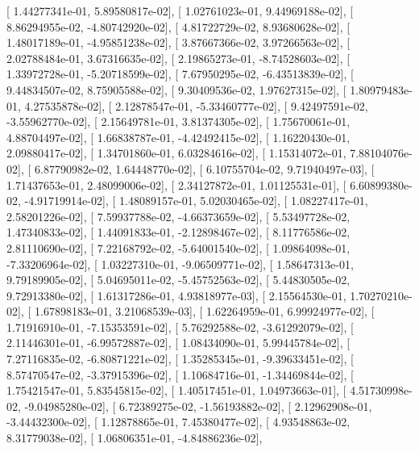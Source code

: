 \documentclass{article}
\begin{document}
       [  1.44277341e-01,   5.89580817e-02],
       [  1.02761023e-01,   9.44969188e-02],
       [  8.86294955e-02,  -4.80742920e-02],
       [  4.81722729e-02,   8.93680628e-02],
       [  1.48017189e-01,  -4.95851238e-02],
       [  3.87667366e-02,   3.97266563e-02],
       [  2.02788484e-01,   3.67316635e-02],
       [  2.19865273e-01,  -8.74528603e-02],
       [  1.33972728e-01,  -5.20718599e-02],
       [  7.67950295e-02,  -6.43513839e-02],
       [  9.44834507e-02,   8.75905588e-02],
       [  9.30409536e-02,   1.97627315e-02],
       [  1.80979483e-01,   4.27535878e-02],
       [  2.12878547e-01,  -5.33460777e-02],
       [  9.42497591e-02,  -3.55962770e-02],
       [  2.15649781e-01,   3.81374305e-02],
       [  1.75670061e-01,   4.88704497e-02],
       [  1.66838787e-01,  -4.42492415e-02],
       [  1.16220430e-01,   2.09880417e-02],
       [  1.34701860e-01,   6.03284616e-02],
       [  1.15314072e-01,   7.88104076e-02],
       [  6.87790982e-02,   1.64448770e-02],
       [  6.10755704e-02,   9.71940497e-03],
       [  1.71437653e-01,   2.48099006e-02],
       [  2.34127872e-01,   1.01125531e-01],
       [  6.60899380e-02,  -4.91719914e-02],
       [  1.48089157e-01,   5.02030465e-02],
       [  1.08227417e-01,   2.58201226e-02],
       [  7.59937788e-02,  -4.66373659e-02],
       [  5.53497728e-02,   1.47340833e-02],
       [  1.44091833e-01,  -2.12898467e-02],
       [  8.11776586e-02,   2.81110690e-02],
       [  7.22168792e-02,  -5.64001540e-02],
       [  1.09864098e-01,  -7.33206964e-02],
       [  1.03227310e-01,  -9.06509771e-02],
       [  1.58647313e-01,   9.79189905e-02],
       [  5.04695011e-02,  -5.45752563e-02],
       [  5.44830505e-02,   9.72913380e-02],
       [  1.61317286e-01,   4.93818977e-03],
       [  2.15564530e-01,   1.70270210e-02],
       [  1.67898183e-01,   3.21068539e-03],
       [  1.62264959e-01,   6.99924977e-02],
       [  1.71916910e-01,  -7.15353591e-02],
       [  5.76292588e-02,  -3.61292079e-02],
       [  2.11446301e-01,  -6.99572887e-02],
       [  1.08434090e-01,   5.99445784e-02],
       [  7.27116835e-02,  -6.80871221e-02],
       [  1.35285345e-01,  -9.39633451e-02],
       [  8.57470547e-02,  -3.37915396e-02],
       [  1.10684716e-01,  -1.34469844e-02],
       [  1.75421547e-01,   5.83545815e-02],
       [  1.40517451e-01,   1.04973663e-01],
       [  4.51730998e-02,  -9.04985280e-02],
       [  6.72389275e-02,  -1.56193882e-02],
       [  2.12962908e-01,  -3.44432300e-02],
       [  1.12878865e-01,   7.45380477e-02],
       [  4.93548863e-02,   8.31779038e-02],
       [  1.06806351e-01,  -4.84886236e-02],
\end{document}
